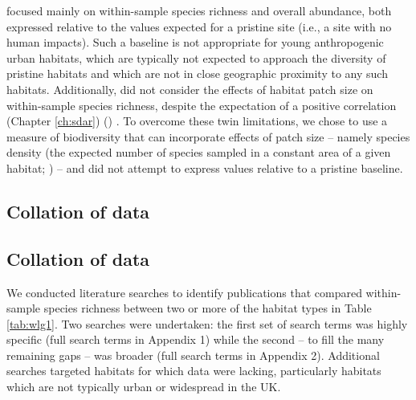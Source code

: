 \cite{Newbold:2015nat} focused mainly on within-sample species richness and overall abundance, both expressed relative to the values expected for a pristine site (i.e., a site with no human impacts). Such a baseline is not appropriate for young anthropogenic urban habitats, which are typically not expected to approach the diversity of pristine habitats and which are not in close geographic proximity to any such habitats. Additionally, \cite{Newbold:2015nat} did not consider the effects of habitat patch size on within-sample species richness, despite the expectation of a positive correlation 
\ifappendixStyle %
(Chapter \ref{ch:sdar})%
\else
(\citealt{Phillips:2015sdar})
\fi
. To overcome these twin limitations, we chose to use a measure of biodiversity that can incorporate effects of patch size -- namely species density (the expected number of species sampled in a constant area of a given habitat; \citealt{Whittaker:2001uz,Magurran:2004tn}) -- and did not attempt to express values relative to a pristine baseline.

\ifappendixStyle %
\subsection{Collation of data}%
\else
\subsection*{Collation of data}
\fi

We conducted literature searches to identify publications that compared within-sample species richness between two or more of the habitat types in Table \ref{tab:wlg1}. Two searches were undertaken: the first set of search terms was highly specific (full search terms in Appendix 1) while the second -- to fill the many remaining gaps -- was broader (full search terms in Appendix 2). Additional searches targeted habitats for which data were lacking, particularly habitats which are not typically urban or widespread in the UK.

